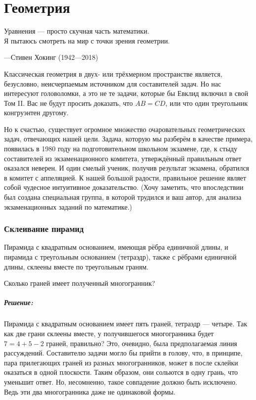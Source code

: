 \chapter*{Геометрия}

\setlength{\epigraphwidth}{.72\textwidth}
\epigraph{Уравнения --- просто скучная часть математики.\\
Я пытаюсь смотреть на мир с точки зрения геометрии.}{---Стивен Хокинг (1942---2018)}

Классическая геометрия в двух- или трёхмерном пространстве является, безусловно, неисчерпаемым источником для составителей задач. 
Но нас интересуют головоломки, а это не те задачи, которые бы Евклид включил в свой Том II.
Вас не будут просить доказать, что $AB=CD$, или что один треугольник конгруэнтен другому.

Но к счастью, существует огромное множество очаровательных геометрических задач, отвечающих нашей цели. 
Задача, которую мы разберём в качестве примера, появилась в 1980 году на подготовительном  школьном экзамене, %
где, к стыду составителей из экзаменационного комитета,  
утверждённый правильным ответ оказался неверен.
И один смелый ученик, получив результат экзамена, обратился в комитет с аппеляцией.
К нашей большой радости, правильное решение являет собой  чудесное интуитивное доказательство.
(Хочу заметить, что впоследствии был создана специальная группа, в которой  трудился и ваш автор, для анализа экзаменационных заданий по математике.)

\subsection*{Склеивание пирамид}%

Пирамида с квадратным основанием, имеющая рёбра единичной длины, и пирамида с треугольным основанием (тетраэдр), также с рёбрами единичной длины, склеены вместе по треугольным граням.

Сколько граней имеет полученный многогранник?

\paragraph{Решение:}

Пирамида с квадратным основанием имеет пять граней, тетраэдр --- четыре.
Так как две грани склеены вместе, у получившегося многогранника будет $7=4+5-2$ граней, правильно?
Это, очевидно, была предполагаемая линия рассуждений.
Составителю задачи могло бы прийти в голову, что, в принципе, пара прилегающих граней из разных многогранников, может в после склейки оказаться в одной плоскости.
Таким образом, они сольются в одну грань, что уменьшит ответ.
Но, несомненно, такое совпадение должно быть исключено.
Ведь эти два многогранника даже не одинаковой формы.

